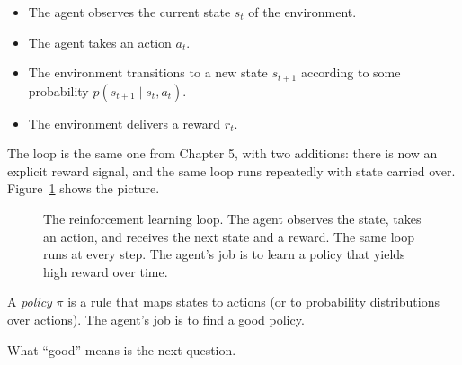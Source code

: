 \begin{itemize}
\item The agent observes the current state $s_t$ of the environment.
\item The agent takes an action $a_t$.
\item The environment transitions to a new state $s_{t+1}$ according to some probability $p(s_{t+1} \mid s_t, a_t)$.
\item The environment delivers a reward $r_t$.
\end{itemize}

The loop is the same one from Chapter 5, with two additions: there is now an explicit reward signal, and the same loop runs repeatedly with state carried over. Figure~\ref{fig:rl-loop} shows the picture.

\begin{figure}[h]
\centering
{}
\caption{The reinforcement learning loop. The agent observes the state, takes an action, and receives the next state and a reward. The same loop runs at every step. The agent's job is to learn a policy that yields high reward over time.}
\label{fig:rl-loop}
\end{figure}

A \emph{policy} $\pi$ is a rule that maps states to actions (or to probability distributions over actions). The agent's job is to find a good policy.

What ``good'' means is the next question.

